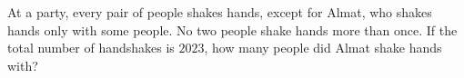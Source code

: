 At a party, every pair of people shakes hands, except for Almat, who shakes hands only with some people. No two people shake hands more than once. If the total number of handshakes is $2023$, how many people did Almat shake hands with?

